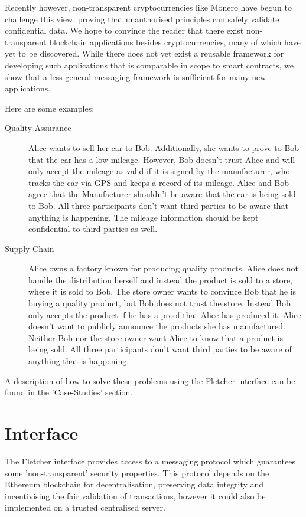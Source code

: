 \documentclass[a4paper]{article} %
\begin{document}
Recently however, non-transparent cryptocurrencies like Monero have begun to challenge this view, proving that unauthorised principles can safely validate confidential data. We hope to convince the reader that there exist non-transparent blockchain applications besides cryptocurrencies, many of which have yet to be discovered. While there does not yet exist a reusable framework for developing such applications that is comparable in scope to smart contracts, we show that a less general messaging framework is sufficient for many new applications.


Here are some examples:

\begin{description}
\item[Quality Assurance]
Alice wants to sell her car to Bob. Additionally, she wants to prove to Bob that the car has a low mileage. However, Bob doesn't trust Alice and will only accept the mileage as valid if it is signed by the manufacturer, who tracks the car via GPS and keeps a record of its mileage. Alice and Bob agree that the Manufacturer shouldn't be aware that the car is being sold to Bob. All three participants don't want third parties to be aware that anything is happening. The mileage information should be kept confidential to third parties as well.
\item[Supply Chain]
Alice owns a factory known for producing quality products. Alice does not handle the distribution herself and instead the product is sold to a store, where it is sold to Bob. The store owner wants to convince Bob that he is buying a quality product, but Bob does not trust the store. Instead Bob only accepts the product if he has a proof that Alice has produced it. Alice doesn't want to publicly announce the products she has manufactured. Neither Bob nor the store owner want Alice to know that a product is being sold. All three participants don't want third parties to be aware of anything that is happening.

\end{description}
A description of how to solve these problems using the Fletcher interface can be found in the 'Case-Studies' section.

\newpage

\section{Interface}
The Fletcher interface provides access to a messaging protocol which guarantees some 'non-transparent' security properties. This protocol depends on the Ethereum blockchain for decentralisation, preserving data integrity and incentivising the fair validation of transactions, however it could also be implemented on a trusted centralised server.
\end{document}
